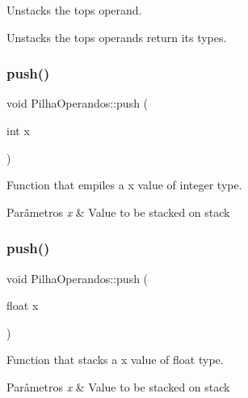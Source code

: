 Unstacks the top\textquotesingle{}s operand. 

Unstacks the top\textquotesingle{}s operands return it\textquotesingle{}s types. \mbox{\label{classPilhaOperandos_aebcb6ec63863f3f273f2ded4331de26a}} 
\subsubsection{\texorpdfstring{push()}{push()}\hspace{0.1cm}{\footnotesize\ttfamily [1/7]}}
{\footnotesize\ttfamily void Pilha\+Operandos\+::push (\begin{DoxyParamCaption}\item[{int}]{x }\end{DoxyParamCaption})}



Function that empiles a x value of integer type. 


\begin{DoxyParams}{Parâmetros}
{\em x} & Value to be stacked on stack \\
\hline
\end{DoxyParams}
\mbox{\label{classPilhaOperandos_ab696a021a389db273c043bedf1e5f4d6}} 
\subsubsection{\texorpdfstring{push()}{push()}\hspace{0.1cm}{\footnotesize\ttfamily [2/7]}}
{\footnotesize\ttfamily void Pilha\+Operandos\+::push (\begin{DoxyParamCaption}\item[{float}]{x }\end{DoxyParamCaption})}



Function that stacks a x value of float type. 


\begin{DoxyParams}{Parâmetros}
{\em x} & Value to be stacked on stack \\
\hline
\end{DoxyParams}
\mbox{\label{classPilhaOperandos_a4b55bb7ee498ded849f19702e602fe85}} 

